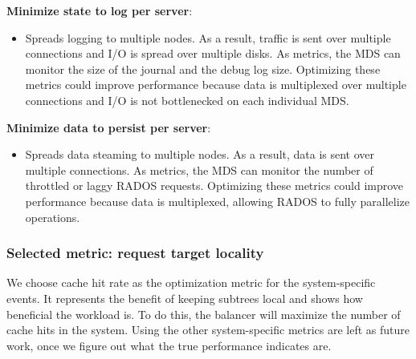 \noindent\textbf{Minimize state to log per server}: 
\begin{itemize}
	\item[] Spreads logging to multiple nodes. As a result, traffic is sent over multiple connections and I/O is spread over multiple disks. As metrics, the MDS can monitor the size of the journal and the debug log size. Optimizing these metrics could improve performance because data is multiplexed over multiple connections and I/O is not bottlenecked on each individual MDS.
\end{itemize}

\noindent\textbf{Minimize data to persist per server}: 
\begin{itemize}
	\item[] Spreads data steaming to multiple nodes. As a result, data is sent over multiple connections. As metrics, the MDS can monitor the number of throttled or laggy RADOS requests. Optimizing these metrics could improve performance because data is multiplexed, allowing 
RADOS to fully parallelize operations.
\end{itemize}


\subsubsection*{Selected metric: request target locality}
We choose cache hit rate as the optimization metric for the system-specific events. It represents the benefit of keeping subtrees local and shows how beneficial the workload is. To do this, the balancer will maximize the number of cache hits in the system. Using the other system-specific metrics are left as future work, once we figure out what the true performance indicates are.

